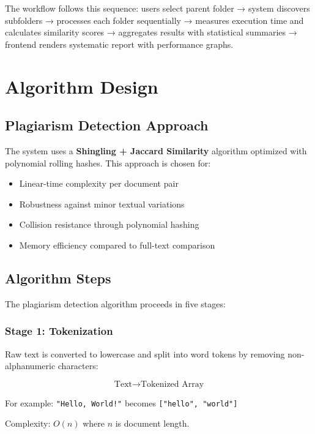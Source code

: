 \documentclass[12pt,oneside,openany]{report}
\begin{document}
The workflow follows this sequence: users select parent folder → system discovers subfolders → processes each folder sequentially → measures execution time and calculates similarity scores → aggregates results with statistical summaries → frontend renders systematic report with performance graphs.

\chapter{Algorithm Design}

\section{Plagiarism Detection Approach}

The system uses a \textbf{Shingling + Jaccard Similarity} algorithm optimized with polynomial rolling hashes. This approach is chosen for:
\begin{itemize}
  \item Linear-time complexity per document pair
  \item Robustness against minor textual variations
  \item Collision resistance through polynomial hashing
  \item Memory efficiency compared to full-text comparison
\end{itemize}

\section{Algorithm Steps}

The plagiarism detection algorithm proceeds in five stages:

\subsection{Stage 1: Tokenization}

Raw text is converted to lowercase and split into word tokens by removing non-alphanumeric characters:

$$\text{Text} \rightarrow \text{Tokenized Array}$$

For example: \texttt{"Hello, World!"} becomes \texttt{["hello", "world"]}

Complexity: $O(n)$ where $n$ is document length.
\end{document}
